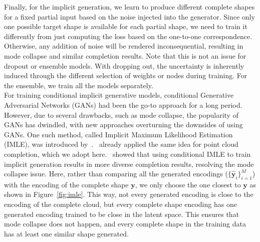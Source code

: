         Finally, for the implicit generation, we learn to produce different complete shapes for a fixed partial input based on the noise injected into the generator. Since only one possible target shape is available for each partial shape, we need to train it differently from just computing the loss based on the one-to-one correspondence. Otherwise, any addition of noise will be rendered inconsequential, resulting in mode collapse and similar completion results. Note that this is not an issue for dropout or ensemble models. With dropping out, the uncertainty is inherently induced through the different selection of weights or nodes during training. For the ensemble, we train all the models separately. 
        \\
        For training conditional implicit generative models, conditional Generative Adversarial Networks (GANs) had been the go-to approach for a long period. However, due to several drawbacks, such as mode collapse, the popularity of GANs has dwindled, with new approaches overturning the downsides of using GANs. One such method, called Implicit Maximum Likelihood Estimation (IMLE), was introduced by~\cite{IMLE}.~\cite{PCCIMLE} already applied the same idea for point cloud completion, which we adopt here.~\cite{PCCIMLE} showed that using conditional IMLE to train implicit generation results in more diverse completion results, resolving the mode collapse issue. Here, rather than comparing all the generated encodings ($\{\mathbf{\hat{y}}_i\}_{i=1}^M$) with the encoding of the complete shape $\mathbf{y}$, we only choose the one closest to $\mathbf{y}$ as shown in Figure~\ref{fig:imle}. This way, not every generated encoding is close to the encoding of the complete cloud, but every complete shape encoding has one generated encoding trained to be close in the latent space. This ensures that mode collapse does not happen, and every complete shape in the training data has at least one similar shape generated.

